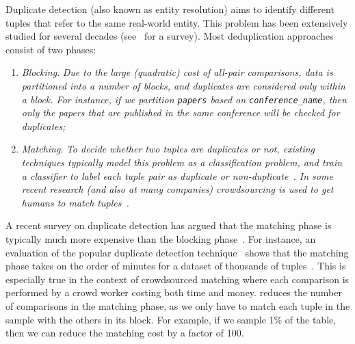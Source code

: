 Duplicate detection (also known as entity resolution) aims to identify different tuples that refer to the same real-world entity. This problem has been extensively studied for several decades (see~\cite{DBLP:journals/tkde/ElmagarmidIV07} for a survey).  
Most deduplication approaches consist of two phases:

\begin{enumerate}\vspace{-.25em}
\item \emph{Blocking}. 
\textit{Due to the large (quadratic) cost of all-pair comparisons, data is partitioned into a number of blocks, and duplicates are considered only within a block. 
For instance, if we partition \texttt{papers} based on \texttt{conference\_name}, then only the papers that are published in the same conference will be checked for duplicates; \vspace{-.25em}}
\vspace{-.25em}
\item \emph{Matching}. 
\textit{To decide whether two tuples are duplicates or not, existing techniques typically model this problem as a classification problem, and train a classifier to label each tuple pair as duplicate or non-duplicate~\cite{DBLP:conf/kdd/BilenkoM03}. 
In some recent research (and also at many companies) crowdsourcing is used to get humans to match tuples~\cite{DBLP:journals/pvldb/WangKFF12,DBLP:conf/www/DemartiniDC12}.}
\end{enumerate}\vspace{-.25em}

A recent survey on duplicate detection has argued that the matching phase is typically much more expensive than the blocking phase~\cite{journals/tkde/Christen11}. 
For instance, an evaluation of the popular duplicate detection technique~\cite{DBLP:conf/kdd/BilenkoM03} shows that the matching phase takes on the order of minutes for a dataset of thousands of tuples~\cite{journals/pvldb/KopckeTR10}.
This is especially true in the context of crowdsourced matching where each comparison is performed by a crowd worker costing both time and money.
\saqpplus reduces the number of comparisons in the matching phase, as we only have to match each tuple in the sample with the others in its block.
For example, if we sample 1\% of the table, then we can reduce the matching cost by a factor of 100.


